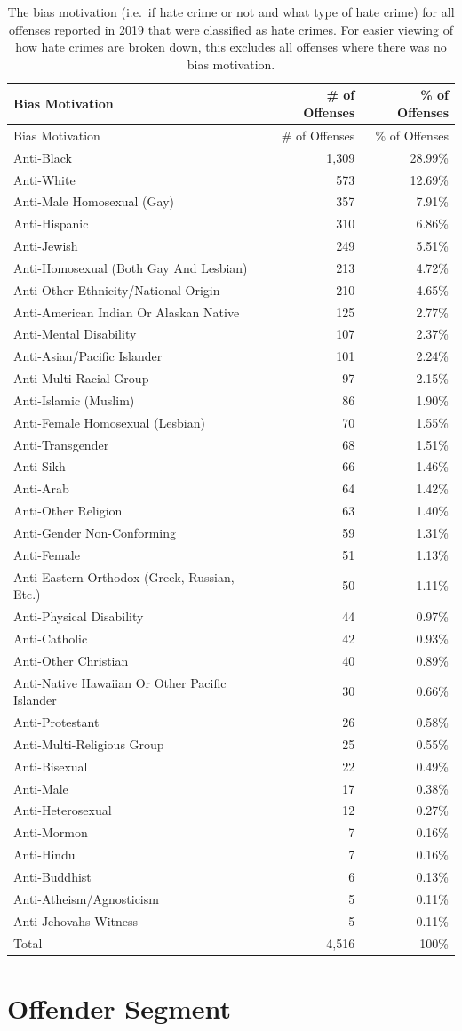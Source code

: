 \documentclass[
  12pt,
  openany]{book}
\begin{document}
\begin{longtable}[]{@{}lrr@{}}
\caption{\label{tab:offenseBiasMotivationBiases}The bias motivation (i.e.~if hate crime or not and what type of hate crime) for all offenses reported in 2019 that were classified as hate crimes. For easier viewing of how hate crimes are broken down, this excludes all offenses where there was no bias motivation.}\tabularnewline
\toprule
Bias Motivation & \# of Offenses & \% of Offenses\tabularnewline
\midrule
\endfirsthead
\toprule
Bias Motivation & \# of Offenses & \% of Offenses\tabularnewline
\midrule
\endhead
Anti-Black & 1,309 & 28.99\%\tabularnewline
Anti-White & 573 & 12.69\%\tabularnewline
Anti-Male Homosexual (Gay) & 357 & 7.91\%\tabularnewline
Anti-Hispanic & 310 & 6.86\%\tabularnewline
Anti-Jewish & 249 & 5.51\%\tabularnewline
Anti-Homosexual (Both Gay And Lesbian) & 213 & 4.72\%\tabularnewline
Anti-Other Ethnicity/National Origin & 210 & 4.65\%\tabularnewline
Anti-American Indian Or Alaskan Native & 125 & 2.77\%\tabularnewline
Anti-Mental Disability & 107 & 2.37\%\tabularnewline
Anti-Asian/Pacific Islander & 101 & 2.24\%\tabularnewline
Anti-Multi-Racial Group & 97 & 2.15\%\tabularnewline
Anti-Islamic (Muslim) & 86 & 1.90\%\tabularnewline
Anti-Female Homosexual (Lesbian) & 70 & 1.55\%\tabularnewline
Anti-Transgender & 68 & 1.51\%\tabularnewline
Anti-Sikh & 66 & 1.46\%\tabularnewline
Anti-Arab & 64 & 1.42\%\tabularnewline
Anti-Other Religion & 63 & 1.40\%\tabularnewline
Anti-Gender Non-Conforming & 59 & 1.31\%\tabularnewline
Anti-Female & 51 & 1.13\%\tabularnewline
Anti-Eastern Orthodox (Greek, Russian, Etc.) & 50 & 1.11\%\tabularnewline
Anti-Physical Disability & 44 & 0.97\%\tabularnewline
Anti-Catholic & 42 & 0.93\%\tabularnewline
Anti-Other Christian & 40 & 0.89\%\tabularnewline
Anti-Native Hawaiian Or Other Pacific Islander & 30 & 0.66\%\tabularnewline
Anti-Protestant & 26 & 0.58\%\tabularnewline
Anti-Multi-Religious Group & 25 & 0.55\%\tabularnewline
Anti-Bisexual & 22 & 0.49\%\tabularnewline
Anti-Male & 17 & 0.38\%\tabularnewline
Anti-Heterosexual & 12 & 0.27\%\tabularnewline
Anti-Mormon & 7 & 0.16\%\tabularnewline
Anti-Hindu & 7 & 0.16\%\tabularnewline
Anti-Buddhist & 6 & 0.13\%\tabularnewline
Anti-Atheism/Agnosticism & 5 & 0.11\%\tabularnewline
Anti-Jehovahs Witness & 5 & 0.11\%\tabularnewline
Total & 4,516 & 100\%\tabularnewline
\bottomrule
\end{longtable}

\hypertarget{offender-segment-1}{%
\chapter{Offender Segment}\label{offender-segment-1}}
\end{document}
